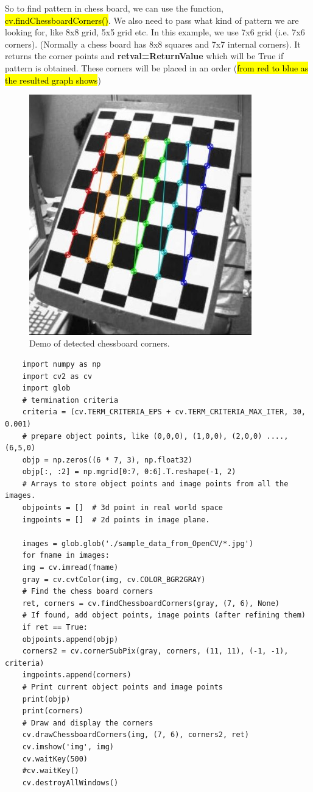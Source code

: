 \documentclass{article}
\begin{document}
So to find pattern in chess board, we can use the function, \hl{cv.findChessboardCorners()}. We also need to pass what kind of pattern we are looking for, like 8x8 grid, 5x5 grid etc. In this example, we use 7x6 grid (i.e. 7x6 corners). (Normally a chess board has 8x8 squares and 7x7 internal corners). It returns the corner points and \textbf{retval=ReturnValue} which will be True if pattern is obtained. These corners will be placed in an order (\hl{from red to blue as the resulted graph shows})
\begin{figure}[!t]
	\centering
	\includegraphics[height=4.1in,width=5.0 in]{./img_cur/calib_pattern_demo.jpg}
	\caption{Demo of detected chessboard corners.}
	\vspace{-1.0em}
	\label{fig_calib_corners_demo}
\end{figure}

\lstset{language=Python}
\lstset{frame=lines}
\lstset{basicstyle=\footnotesize}
\begin{lstlisting}
	import numpy as np
	import cv2 as cv
	import glob
	# termination criteria
	criteria = (cv.TERM_CRITERIA_EPS + cv.TERM_CRITERIA_MAX_ITER, 30, 0.001)
	# prepare object points, like (0,0,0), (1,0,0), (2,0,0) ....,(6,5,0)
	objp = np.zeros((6 * 7, 3), np.float32)
	objp[:, :2] = np.mgrid[0:7, 0:6].T.reshape(-1, 2)
	# Arrays to store object points and image points from all the images.
	objpoints = []  # 3d point in real world space
	imgpoints = []  # 2d points in image plane.
	
	images = glob.glob('./sample_data_from_OpenCV/*.jpg')
	for fname in images:
	img = cv.imread(fname)
	gray = cv.cvtColor(img, cv.COLOR_BGR2GRAY)
	# Find the chess board corners
	ret, corners = cv.findChessboardCorners(gray, (7, 6), None)
	# If found, add object points, image points (after refining them)
	if ret == True:
	objpoints.append(objp)
	corners2 = cv.cornerSubPix(gray, corners, (11, 11), (-1, -1), criteria)
	imgpoints.append(corners)
	# Print current object points and image points
	print(objp)
	print(corners)
	# Draw and display the corners
	cv.drawChessboardCorners(img, (7, 6), corners2, ret)
	cv.imshow('img', img)
	cv.waitKey(500)
	#cv.waitKey()
	cv.destroyAllWindows()
\end{lstlisting}
\end{document}
